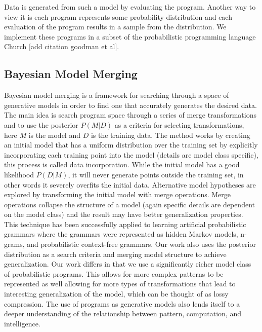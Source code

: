 \documentclass[a4paper,10pt]{article}
\begin{document}
Data is generated from such a model by evaluating the program.  Another way to view it is each program represents some probability distribution and each 
evaluation of the program results in a sample from the distribution. We implement these programs in a subset of the probabilistic programming language Church [add citation goodman et al].  


\subsection{Bayesian Model Merging}
Bayesian model merging is a framework for searching through a space of generative models in order to find one that accurately generates the desired data.  The main idea is search program space through a series of merge transformations and to use the posterior $P(M|D)$ as a criteria for selecting transformations, here $M$ is the model and $D$ is the training data.  The method works by creating an initial model that has a uniform distribution over the training set by explicitly incorporating each training point into the model (details are model class specific), this process is called data incorporation.  While the initial model has a good likelihood $P(D|M)$, it will never generate points outside the training set, in other words it severely overfits the initial data.  Alternative model hypotheses are explored by transforming the initial model with merge operations.  Merge operations collapse the structure of a model (again specific details are dependent on the model class) and the result may have better generalization properties.  This technique has been successfully applied to learning artificial probabilistic grammars where the grammars were represented as hidden Markov models, n-grams, and probabilistic context-free grammars.  Our work also uses the posterior distribution as a search criteria and merging model structure to achieve generalization.  Our work differs in that we use a significantly richer model class of probabilistic programs.  This allows for more complex patterns to be represented as well allowing for more types of transformations that lead to interesting generalization of the model, which can be thought of as lossy compression.   The use of programs as generative models also lends itself to a deeper understanding of the relationship between pattern, computation, and intelligence.
\end{document}
